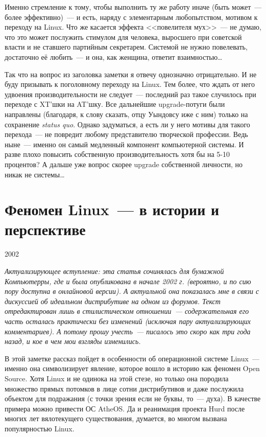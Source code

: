 Именно стремление к тому, чтобы выполнить ту же работу иначе (быть может~--- более эффективно)~--- и есть, наряду с элементарным любопытством, мотивом к переходу на Linux. Что же касается эффекта <<повелителя мух>>~--- не думаю, что это может послужить стимулом для человека, выросшего при советской власти и не ставшего партийным секретарем. Системой не нужно повелевать, достаточно её любить~--- и она, как женщина, ответит взаимностью\dots 

Так что на вопрос из заголовка заметки я отвечу однозначно отрицательно. И не буду призывать к поголовному переходу на Linux. Тем более, что ждать от него удвоения производительности не следует~--- последний раз такое случилось при переходе с XT'шки на AT'шку. Все дальнейшие upgrade-потуги были направлены (благодаря, к слову сказать, отцу Уындовсу иже с ним) только на сохранение \textit{status quo}. Однако задуматься, а есть ли у него мотивы для такого перехода~--- не повредит любому представителю творческой профессии. Ведь ныне~--- именно он самый медленный компонент компьютерной системы. И разве плохо повысить собственную производительность хотя бы на 5-10 процентов? А дальше уже вопрос скорее upgrade собственной личности, но никак не системы\dots

\section{Феномен Linux~--- в истории и перспективе} 
\begin{timeline}2002\end{timeline}

\textsl{Актуализирующее вступление: эта статья сочинялась для бумажной Компьютерры, где и была опубликована в начале 2002 г. (вероятно, и по сию пору доступна в онлайновой версии). А актуальной она показалась мне в связи с дискуссией об идеальном дистрибутиве на одном из форумов. Текст отредактирован лишь в стилистическом отношении~--- содержательная его часть осталась практически без изменений (исключая пару актуализирующих комментариев). А потому прошу учесть~--- писалось это скоро как три года назад, и кое в чем мои взгляды изменились.}\medskip

В этой заметке рассказ пойдет в особенности об операционной системе Linux~--- именно она символизирует явление, которое вошло в историю как феномен Open Source. Хотя Linux и не одинока на этой стезе, но только она породила множество прямых потомков в лице сотни дистрибутивов и даже послужила объектом для подражания (с точки зрения если не буквы, то~--- духа). В качестве примера можно привести ОС AtheOS. Да и реанимация проекта Hurd после многих лет вялотекущего существования, думается, во многом вызвана популярностью Linux.

